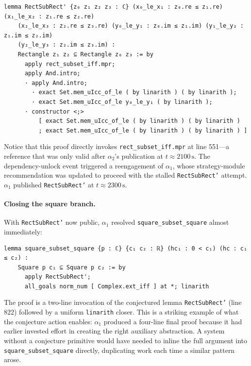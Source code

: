 \begin{lstlisting}[caption={\texttt{RectSubRect'}, conjectured and resolved by $\alpha_1$ (lines 546--558), immediately after $\alpha_2$'s \texttt{rect\_subset\_iff} publication.},label={lst:rectsubrectp}]
lemma RectSubRect' {z₀ z₁ z₂ z₃ : ℂ} (x₀_le_x₁ : z₀.re ≤ z₁.re) (x₁_le_x₂ : z₁.re ≤ z₂.re)
    (x₂_le_x₃ : z₂.re ≤ z₃.re) (y₀_le_y₁ : z₀.im ≤ z₁.im) (y₁_le_y₂ : z₁.im ≤ z₂.im)
    (y₂_le_y₃ : z₂.im ≤ z₃.im) :
    Rectangle z₁ z₂ ⊆ Rectangle z₀ z₃ := by
      apply rect_subset_iff.mpr;
      apply And.intro;
      · apply And.intro;
        · exact Set.mem_uIcc_of_le ( by linarith ) ( by linarith );
        · exact Set.mem_uIcc_of_le y₀_le_y₁ ( by linarith );
      · constructor <;>
          [ exact Set.mem_uIcc_of_le ( by linarith ) ( by linarith )
          ; exact Set.mem_uIcc_of_le ( by linarith ) ( by linarith ) ]
\end{lstlisting}
 
Notice that this proof directly invokes \texttt{rect\_subset\_iff.mpr} at line 551---a reference that was only valid after $\alpha_2$'s publication at $t\!\approx\!2100\,\mathrm{s}$. The dependency-unlock event triggered a reengagement of $\alpha_1$, whose strategy-module recommendation was updated to proceed with the stalled \texttt{RectSubRect'} attempt. $\alpha_1$ published \texttt{RectSubRect'} at $t\!\approx\!2300\,\mathrm{s}$.
 
\paragraph{Closing the square branch.}
With \texttt{RectSubRect'} now public, $\alpha_1$ resolved \texttt{square\_subset\_square} almost immediately:
 
\begin{lstlisting}[caption={\texttt{square\_subset\_square}, resolved by $\alpha_1$ at $t\!\approx\!2400\,\mathrm{s}$ (lines 819--824).},label={lst:squaresquare}]
lemma square_subset_square {p : ℂ} {c₁ c₂ : ℝ} (hc₁ : 0 < c₁) (hc : c₁ ≤ c₂) :
    Square p c₁ ⊆ Square p c₂ := by
      apply RectSubRect';
      all_goals norm_num [ Complex.ext_iff ] at *; linarith
\end{lstlisting}
 
The proof is a two-line invocation of the conjectured lemma \texttt{RectSubRect'} (line 822) followed by a uniform \texttt{linarith} closer. This is a striking example of what the conjecture action enables: $\alpha_1$ produced a four-line final proof because it had earlier invested effort in creating the right auxiliary abstraction. A system without a conjecture primitive would have needed to inline the full argument into \texttt{square\_subset\_square} directly, duplicating work each time a similar pattern arose.
 

